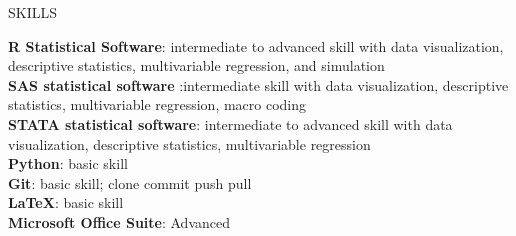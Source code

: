 \documentclass{resume} %
\begin{document}
\begin{rSection}{SKILLS %
   }

\vspace{0.25pt}

\space \textbf{R Statistical Software}: intermediate to advanced skill with data visualization,
descriptive statistics, multivariable regression, and simulation\\
\space\textbf{SAS statistical software} :intermediate skill with data visualization, descriptive statistics,
multivariable regression, macro coding\\
\space \textbf{STATA statistical software}: intermediate to advanced skill with data visualization, descriptive statistics, multivariable regression\\
\space \textbf{Python}: basic skill\\
\space \textbf{Git}: basic skill; clone commit push pull\\
\space \textbf{\LaTeX}: basic skill\\ 
\space \textbf{Microsoft Office Suite}: Advanced\\


\end{rSection}





% 
%
\end{document}
